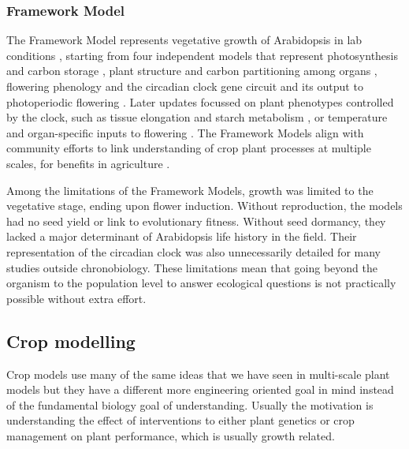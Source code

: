 \subsubsection*{Framework Model}
\label{subsec:fm}
The Framework Model represents vegetative growth of Arabidopsis in lab conditions
\citep{chew_multiscale_2014}, starting from four independent models that
represent photosynthesis and carbon storage \citep{rasse_leaf_2006}, plant
structure and carbon partitioning among organs
\citep{christophe_model-based_2008}, flowering phenology
\citep{chew_augmented_2012} and the circadian clock gene circuit and its output
to photoperiodic flowering \citep{salazar_prediction_2009}. Later updates
focussed on plant phenotypes controlled by the clock, such as tissue elongation
and starch metabolism \citep[FMv2;][]{chew_linking_2017}, or temperature and
organ-specific inputs to flowering
\citep{kinmonth-schultz_mechanistic_2018}. The Framework Models align with
community efforts to link understanding of crop plant processes at multiple
scales, for benefits in agriculture \citep{wu_connecting_2016, zhu_plants_2016}.

Among the limitations of the Framework Models, growth was limited to the
vegetative stage, ending upon flower induction. Without reproduction, the models
had no seed yield or link to evolutionary fitness. Without seed dormancy, they
lacked a major determinant of Arabidopsis life history in the field. Their
representation of the circadian clock was also unnecessarily detailed for many
studies outside chronobiology. These limitations mean that going beyond the
organism to the population level to answer ecological questions is not
practically possible without extra effort.

\subsection{Crop modelling}
Crop models use many of the same ideas that we have seen in multi-scale plant
models but they have a different more engineering oriented goal in mind instead
of the fundamental biology goal of understanding. Usually the motivation is
understanding the effect of interventions to either plant genetics or crop
management on plant performance, which is usually growth related.

